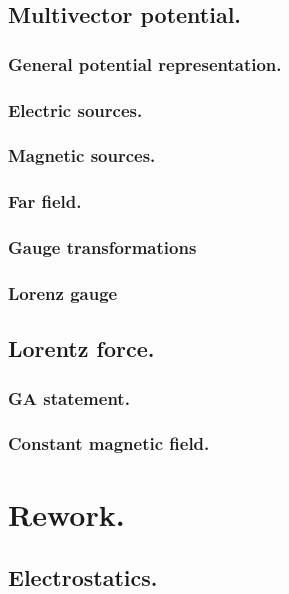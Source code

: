       \section{Multivector potential.}
         \subsection{General potential representation.}
            
         \subsection{Electric sources.}
            
         \subsection{Magnetic sources.}
            
         \subsection{Far field.}
            
         \subsection{Gauge transformations}
            
         \subsection{Lorenz gauge}
            
      \section{Lorentz force.}
         \subsection{GA statement.}
            
         \subsection{Constant magnetic field.}
            
      \chapter{Rework.}
      \section{Electrostatics.}
